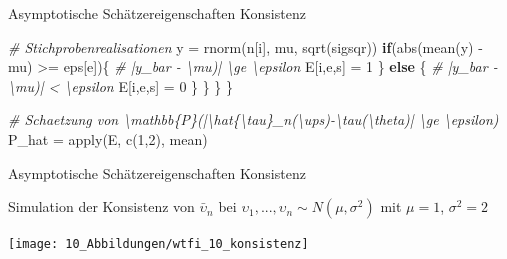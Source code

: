 \documentclass[
  8pt,
  ignorenonframetext,
]{beamer}
\newenvironment{Shaded}{\begin{snugshade}}{\end{snugshade}}
\newcommand{\CommentTok}[1]{\textcolor[rgb]{0.56,0.35,0.01}{\textit{#1}}}
\newcommand{\ControlFlowTok}[1]{\textcolor[rgb]{0.13,0.29,0.53}{\textbf{#1}}}
\newcommand{\DecValTok}[1]{\textcolor[rgb]{0.00,0.00,0.81}{#1}}
\newcommand{\FunctionTok}[1]{\textcolor[rgb]{0.00,0.00,0.00}{#1}}
\newcommand{\NormalTok}[1]{#1}
\newcommand{\OtherTok}[1]{\textcolor[rgb]{0.56,0.35,0.01}{#1}}
\newcommand{\SpecialCharTok}[1]{\textcolor[rgb]{0.00,0.00,0.00}{#1}}
\newcommand{\ups} {\upsilon}
\begin{document}
\begin{frame}[fragile]{\small Asymptotische Schätzereigenschaften
\textbar{} Konsistenz}
\begin{Shaded}
\begin{Highlighting}[]
            \CommentTok{\# Stichprobenrealisationen}
\NormalTok{            y   }\OtherTok{=} \FunctionTok{rnorm}\NormalTok{(n[i], mu, }\FunctionTok{sqrt}\NormalTok{(sigsqr))}
            \ControlFlowTok{if}\NormalTok{(}\FunctionTok{abs}\NormalTok{(}\FunctionTok{mean}\NormalTok{(y) }\SpecialCharTok{{-}}\NormalTok{ mu) }\SpecialCharTok{\textgreater{}=}\NormalTok{ eps[e])\{        }\CommentTok{\# |y\_bar {-} \textbackslash{}mu)| \textbackslash{}ge \textbackslash{}epsilon}
\NormalTok{                E[i,e,s] }\OtherTok{=} \DecValTok{1}
\NormalTok{            \} }\ControlFlowTok{else}\NormalTok{ \{                                }\CommentTok{\# |y\_bar {-} \textbackslash{}mu)| \textless{} \textbackslash{}epsilon}
\NormalTok{                E[i,e,s] }\OtherTok{=} \DecValTok{0}
\NormalTok{            \}}
\NormalTok{        \}}
\NormalTok{    \}}
\NormalTok{\}}

\CommentTok{\# Schaetzung von \textbackslash{}mathbb\{P\}(|\textbackslash{}hat\{\textbackslash{}tau\}\_n(\textbackslash{}ups){-}\textbackslash{}tau(\textbackslash{}theta)| \textbackslash{}ge \textbackslash{}epsilon)}
\NormalTok{P\_hat       }\OtherTok{=} \FunctionTok{apply}\NormalTok{(E, }\FunctionTok{c}\NormalTok{(}\DecValTok{1}\NormalTok{,}\DecValTok{2}\NormalTok{), mean)}
\end{Highlighting}
\end{Shaded}
\end{frame}

\begin{frame}{\small Asymptotische Schätzereigenschaften \textbar{}
Konsistenz}
\protect\hypertarget{asymptotische-schuxe4tzereigenschaften-konsistenz-2}{}
\small
\vspace{2mm}

Simulation der Konsistenz von \(\bar{\ups}_n\) bei
\(\ups_1,...,\ups_n \sim N(\mu,\sigma^2)\) mit \(\mu = 1\),
\(\sigma^2 = 2\)

\begin{center}\texttt{[image: 10\_Abbildungen/wtfi\_10\_konsistenz]} \end{center}
\end{frame}
\end{document}
